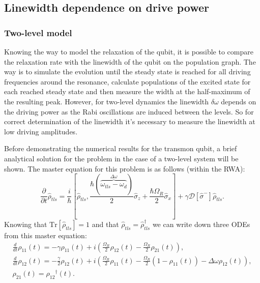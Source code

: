 \subsection{Linewidth dependence on drive power} \label{subsec:linewidth}

\subsubsection{Two-level model}

Knowing the way to model the relaxation of the qubit, it is possible to compare the relaxation rate with the linewidth of the qubit on the population graph. The way is to simulate the evolution until the steady state is reached for all driving frequencies around the resonance, calculate populations of the excited state for each reached steady state and then measure the width at the half-maximum of the resulting peak. However, for two-level dynamics the linewidth $\delta \omega$ depends on the driving power as the Rabi oscillations are induced between the levels. So for correct determination of the linewidth it's necessary to measure the linewidth at low driving amplitudes.

Before demonstrating the numerical results for the transmon qubit, a brief analytical solution for the problem in the case of a two-level system will be shown. The master equation for this problem is as follows (within the RWA):
\[
\frac{\partial}{\partial t} \hat{\rho}_{tls} = \frac{i}{\hbar}[\hat{\rho}_{tls}, \frac{\hbar (\overbrace{\omega_{tls}-\omega_d}^{\Delta\omega})}{2} \hat{\sigma}_z+\frac{\hbar \Omega_R}{2} \hat{\sigma}_x] + \gamma \mathcal{D}[\hat \sigma^-]\hat\rho_{tls}.
\]
Knowing that $\text{Tr}[\hat\rho_{tls}]=1$ and that $\hat\rho_{tls}=\hat\rho_{tls}^\dag$ we can write down three ODEs from this master equation:
\[
\begin{gathered}
\frac{d}{d t} {ρ_{11}}{\left (t \right )} = - γ {ρ_{11}}{\left (t \right )} + i \left(\frac{Ω_{R}}{2} {ρ_{12}}{\left (t \right )} - \frac{Ω_{R}}{2} {ρ_{21}}{\left (t \right )}\right), \\
\frac{d}{d t} {ρ_{12}}{\left (t \right )} = - \frac{γ}{2} {ρ_{12}}{\left (t \right )} + i \left( \frac{Ω_{R}}{2} {ρ_{11}}{\left (t \right )} - \frac{Ω_{R}}{2} \left(1- {ρ_{11}}{\left (t \right )} \right) - \Delta ω {ρ_{12}}{\left (t \right )}\right),\\
{ρ_{21}}{\left (t \right )} = {ρ_{12}}^\dag{\left (t \right )}.
\end{gathered}
\]

